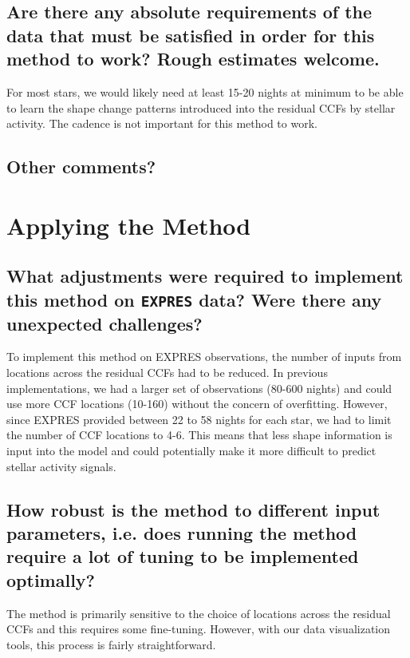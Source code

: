 \documentclass[12pt]{article}
\begin{document}
\subsection{Are there any absolute requirements of the data that must be satisfied in order for this method to work?  Rough estimates welcome.}

For most stars, we would likely need at least 15-20 nights at minimum to be able to learn the shape change patterns introduced into the residual CCFs by stellar activity. The cadence is not important for this method to work.

\subsection{Other comments?}



\section{Applying the Method}
\subsection{What adjustments were required to implement this method on \texttt{EXPRES} data?  Were there any unexpected challenges?}

To implement this method on EXPRES observations, the number of inputs from locations across the residual CCFs had to be reduced. In previous implementations, we had a larger set of observations (80-600 nights) and could use more CCF locations (10-160)  without the concern of overfitting. However, since EXPRES provided between 22 to 58 nights for each star, we had to limit the number of CCF locations to 4-6. This means that less shape information is input into the model and could potentially make it more difficult to predict stellar activity signals.


\subsection{How robust is the method to different input parameters, i.e. does running the method require a lot of tuning to be implemented optimally?}

The method is primarily sensitive to the choice of locations across the residual CCFs and this requires some fine-tuning. However, with our data visualization tools, this process is fairly straightforward.
\end{document}
